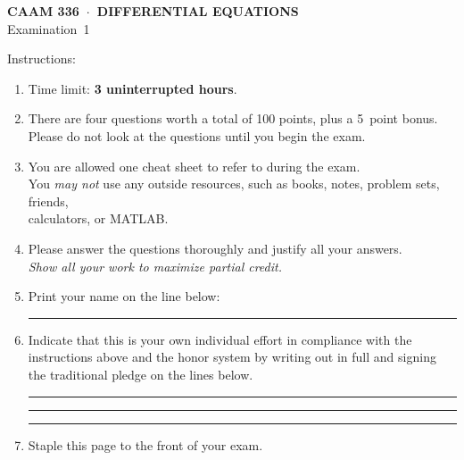 \documentclass[11pt]{article}
\begin{document}
\thispagestyle{empty}
\vspace*{0em}
   \begin{center}
      \textsf{\textbf{CAAM 336\ $\cdot$\ DIFFERENTIAL EQUATIONS}}\\[0.5em]
       \textsf{Examination~1}
   \end{center}
   
\vspace*{3em}
Instructions:
\begin{enumerate}
\item Time limit: \textbf{3 uninterrupted hours}.
\item There are four questions worth a total of 100 points, 
        plus a 5~point bonus.\\
      Please do not look at the questions until you begin the exam.
\item You are allowed one cheat sheet to refer to during the exam. \\
You \emph{may not} use any outside resources, such as books, notes, problem sets, friends,\\
      calculators, or MATLAB. 
\item Please answer the questions thoroughly and justify all your answers.\\
      \emph{Show all your work to maximize partial credit.}

\item Print your name on the line below:

\vspace*{1em}\rule{6in}{0.5pt}

\item Indicate that this is your own individual effort in compliance with 
      the instructions above and the honor system by writing out in full 
      and signing the traditional pledge on the lines below.

\vspace*{1em}\rule{6in}{0.5pt}

\vspace*{1em}\rule{6in}{0.5pt}

\vspace*{1em}\rule{6in}{0.5pt}

\item Staple this page to the front of your exam.

\end{enumerate}
\end{document}
